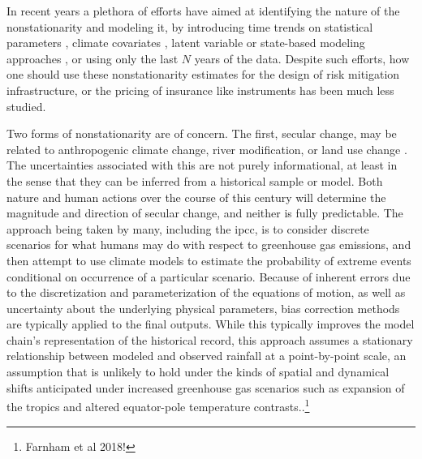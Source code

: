 \documentclass[12pt]{article}
\begin{document}
In recent years a plethora of efforts have aimed at identifying the nature of the nonstationarity and modeling it, \eg{} by introducing time trends on statistical parameters \citep{Strupczewski2001,Vogel2011,Obeysekera2014,Serinaldi2015}, climate covariates \citep{Delgado2014,Griffis2007,Silva2016,Sun2014,Hall2014}, latent variable or state-based modeling approaches \citep{Waylen1986,Sveinsson2005,Griffis2007}, or using only the last $N$ years of the data.
Despite such efforts, how one should use these nonstationarity estimates for the design of risk mitigation infrastructure, or the pricing of insurance like instruments has been much less studied.

Two forms of nonstationarity are of concern.
The first, secular change, may be related to anthropogenic climate change, river modification, or land use change \citep{Milly2008,Merz2014}.
The uncertainties associated with this are not purely informational, at least in the sense that they can be inferred from a historical sample or model.
Both nature and human actions over the course of this century will determine the magnitude and direction of secular change, and neither is fully predictable.
The approach being taken by many, including the \gls{ipcc}, is to consider discrete scenarios for what humans may do with respect to greenhouse gas emissions, and then attempt to use climate models to estimate the probability of extreme events conditional on occurrence of a particular scenario.
Because of inherent errors due to the discretization and parameterization of the equations of motion, as well as uncertainty about the underlying physical parameters, bias correction methods \citep[\eg quantile-quantile mapping;][]{Rajczak2016} are typically applied to the final outputs.
While this typically improves the model chain's representation of the historical record, this approach assumes a stationary relationship between modeled and observed rainfall at a point-by-point scale, an assumption that is unlikely to hold under the kinds of spatial and dynamical shifts anticipated under increased greenhouse gas scenarios such as expansion of the tropics and altered equator-pole temperature contrasts.\citep{Dankers2009,Ott2013,Merz2014,Dittes2017}.\footnote{Farnham et al 2018!}
\end{document}
